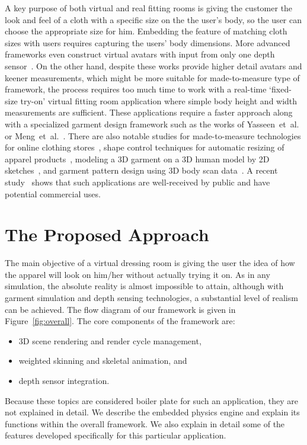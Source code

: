 \documentclass[number,preprint,review,12pt]{elsarticle}
\begin{document}
A key purpose of both virtual and real fitting rooms is giving the customer the look and feel of a cloth with a specific size on the the user's body, so the user can choose the appropriate size for him. Embedding the feature of matching cloth sizes with users requires capturing the users' body dimensions. More advanced frameworks even construct virtual avatars with input from only one depth sensor~\cite{Cui2013,Cui2010}. On the other hand, despite these works provide higher detail avatars and keener measurements, which might be more suitable for made-to-measure type of framework, the process requires too much time to work with a real-time `fixed-size try-on' virtual fitting room application where simple body height and width measurements are sufficient. These applications require a faster approach along with a specialized garment design framework such as the works of Yasseen~et~al.~\cite{Yasseen2013} or Meng~et~al.~\cite{Meng2010}. There are also notable studies for made-to-measure technologies for online clothing stores~\cite{Cordier2003}, shape control techniques for automatic resizing of apparel products~\cite{Meng2012}, modeling a 3D garment on a 3D human model by 2D sketches~\cite{Wang2003}, and garment pattern design using 3D body scan data~\cite{Kim2003}. A recent study~\cite{Kim2013} shows that such applications are well-received by public and have potential commercial uses.     

\section{The Proposed Approach}
\label{sec:Overall}
The main objective of a virtual dressing room is giving the user the idea of how the apparel will look on him/her without actually trying it on. As in any simulation, the absolute reality is almost impossible to attain, although with garment simulation and depth sensing technologies, a substantial level of realism can be achieved. The flow diagram of our framework is given in Figure~\ref{fig:overall}. The core components of the framework are:

\begin{itemize}
  \item 3D scene rendering and render cycle management, 
  \item weighted skinning and skeletal animation, and
  \item depth sensor integration.
\end{itemize}

Because these topics are considered boiler plate for such an application, they are not explained in detail. We describe the embedded physics engine and explain its functions within the overall framework. We also explain in detail some of the features developed specifically for this particular application. 
\end{document}
